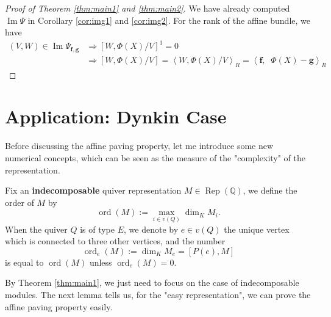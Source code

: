 \documentclass[reqno,11pt]{amsart}
\numberwithin{equation}{section}
\theoremstyle{plain}
\theoremstyle{plain}
\numberwithin{equation}{section}
\theoremstyle{remark}
\DeclareMathOperator{\Img}{\operatorname{Im}}
\DeclareMathOperator{\Rep}{\operatorname{Rep}}
\DeclareMathOperator{\dimv}{\operatorname{\underline{\mathbf{dim}}}}
\newcommand{\dimvec}[1]{\mathbf{#1}}
\newcommand{\ord}{\operatorname{ord}}
\newcommand{\orde}{\operatorname{ord}_e }
\begin{document}
\begin{proof}[{Proof of Theorem \ref{thm:main1} and \ref{thm:main2}}]
We have already computed $\Img \Psi$ in Corollary \ref{cor:img1} and \ref{cor:img2}. For the rank of the affine bundle, we have 
\begin{equation*}
\begin{aligned}
(V,W) \in \Img \Psi_{\dimvec{f},\dimvec{g}} &\Longrightarrow [W,\Phi(X)/V]^1=0\\
& \Longrightarrow [W,\Phi(X)/V]=\left< W,\Phi(X)/V\right>_R=\left< \dimvec{f},\dimv \Phi(X)-\dimvec{g}\right>_R
\end{aligned}
\end{equation*}
\end{proof}

\section{Application: Dynkin Case}\label{sec:Dynkin}
Before discussing the affine paving property, let me introduce some new numerical concepts, which can be seen as the measure of the "complexity" of the representation.

Fix an \textbf{indecomposable} quiver representation $M \in \Rep(\mathbb{Q})$, we define the order of $M$ by
$$\ord(M):= \max_{i \in v(Q)} \dim_K M_i.$$
When the quiver $Q$ is of type $E$, we denote by $e \in v(Q)$ the unique vertex which is connected to three other vertices, and the number 
$$\orde(M):=\dim_K M_e=[P(e),M]$$
is equal to $\ord(M)$ unless $\orde(M)=0$.

By Theorem \ref{thm:main1}, we just need to focus on the case of indecomposable modules. The next lemma tells us, for the "easy representation", we can prove the affine paving property easily.
\end{document}
